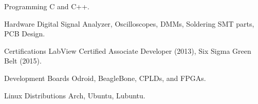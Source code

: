 
\begin{cvskills}


	\cvskill
		{Programming}
			{C and C++.}

	\cvskill
		{Hardware}
			{Digital Signal Analyzer, Oscilloscopes, DMMs, Soldering SMT parts, PCB Design.}

	\cvskill
		{Certifications}
			{LabView Certified Associate Developer (2013), Six Sigma Green Belt (2015).}

	\cvskill
		{Development Boards}
			{Odroid, BeagleBone, CPLDs, and FPGAs.}

	\cvskill
		{Linux Distributions}
			{Arch, Ubuntu, Lubuntu.}


\end{cvskills}
